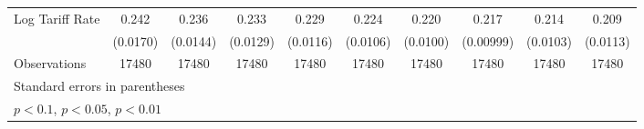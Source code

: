 {\begin{tabular}{l*{9}{c}}
Log Tariff Rate     &       0.242\sym{***}&       0.236\sym{***}&       0.233\sym{***}&       0.229\sym{***}&       0.224\sym{***}&       0.220\sym{***}&       0.217\sym{***}&       0.214\sym{***}&       0.209\sym{***}\\
                    &    (0.0170)         &    (0.0144)         &    (0.0129)         &    (0.0116)         &    (0.0106)         &    (0.0100)         &   (0.00999)         &    (0.0103)         &    (0.0113)         \\
\hline
Observations        &       17480         &       17480         &       17480         &       17480         &       17480         &       17480         &       17480         &       17480         &       17480         \\
\hline\hline
\multicolumn{10}{l}{\footnotesize Standard errors in parentheses}\\
\multicolumn{10}{l}{\footnotesize \sym{*} \(p<0.1\), \sym{**} \(p<0.05\), \sym{***} \(p<0.01\)}\\
\end{tabular}
}
